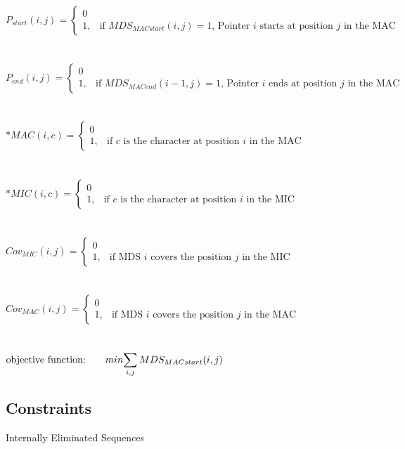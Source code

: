 $P_{start}(i,j) = \begin{cases} 0 \\ 1, & \mbox{if } MDS_{MACstart}(i,j) = 1 \mbox{, Pointer } i \mbox{ starts at position } j \mbox{ in the MAC} \end{cases}$ \\\\\\
$P_{end}(i,j) = \begin{cases} 0 \\ 1, & \mbox{if } MDS_{MACend}(i-1,j) = 1 \mbox{, Pointer } i \mbox{ ends at position } j \mbox{ in the MAC} \end{cases}$ \\\\\\
$*MAC(i,c) = \begin{cases} 0 \\ 1, & \mbox{if } c\mbox{ is the character at position } i \mbox{ in the MAC} \end{cases}$ \\\\\\
$*MIC(i,c) = \begin{cases} 0 \\ 1, & \mbox{if } c\mbox{ is the character at position } i \mbox{ in the MIC} \end{cases}$ \\\\\\
$Cov_{MIC}(i,j) = \begin{cases} 0 \\ 1, & \mbox{if MDS } i\mbox{ covers the position } j \mbox{ in the MIC} \end{cases}$ \\\\\\
$Cov_{MAC}(i,j) = \begin{cases} 0 \\ 1, & \mbox{if MDS } i\mbox{ covers the position } j \mbox{ in the MAC} \end{cases}$ \\\\\\

$\mbox{objective function:} \qquad min \mathlarger{\sum_{i,j} MDS_{MACstart}(i,j)}$

\subsection{Constraints}
Internally Eliminated Sequences \\\\\\


